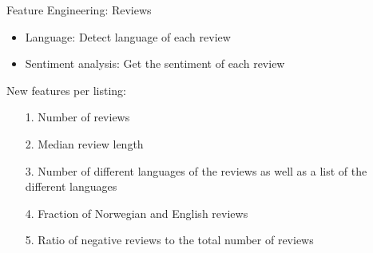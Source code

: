 \documentclass[ngerman,inputenc]{beamer}
\begin{document}
\begin{frame}{Feature Engineering: Reviews}
  \begin{itemize}
    \item Language: Detect language of each review
    \item Sentiment analysis: Get the sentiment of each review
  \end{itemize}

  \pause

  \hspace{5pt}

  New features per listing:
  \begin{itemize}
    \item[1.] Number of reviews
    \item[2.] Median review length
    \item[3.] Number of different languages of the reviews as well as a list of the different languages
    \item[4.] Fraction of Norwegian and English reviews
    \item[5.] Ratio of negative reviews to the total number of reviews
  \end{itemize}

\end{frame}
\end{document}

